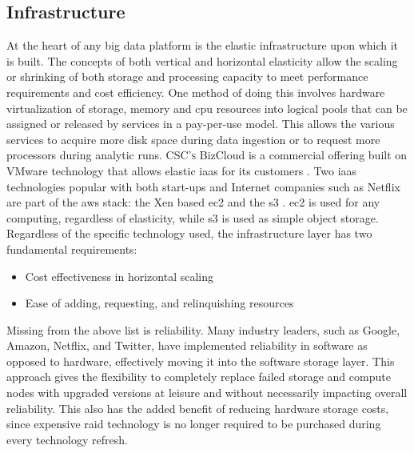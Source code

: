 \subsection{Infrastructure}
At the heart of any big data platform is the elastic infrastructure upon which it is built. The concepts of both vertical and horizontal elasticity allow the scaling or shrinking of both storage and processing capacity to meet performance requirements and cost efficiency. One method of doing this involves hardware virtualization  of storage, memory and \gls{cpu} resources into logical pools that can be assigned or released by services in a pay-per-use model. This allows the various services to acquire more disk space during data ingestion or to request more processors during analytic runs. \textsc{CSC's} BizCloud is a commercial offering built on VMware  technology that allows elastic \gls{iaas} for its customers \cite{bizcloud}. Two \gls{iaas} technologies popular with both start-ups and Internet companies such as Netflix are part of the \gls{aws} stack: the Xen based \gls{ec2} and the \gls{s3} \cite{cockcroft}. \gls{ec2} is used for any computing, regardless of elasticity, while \gls{s3} is used as simple object storage. Regardless of the specific technology used, the infrastructure layer has two fundamental requirements:
\begin{itemize}
    \item Cost effectiveness in horizontal scaling
    \item Ease of adding, requesting, and relinquishing resources
\end{itemize}
Missing from the above list is reliability. Many industry leaders, such as Google, Amazon, Netflix, and Twitter, have implemented reliability in software as opposed to hardware, effectively moving it into the software storage layer. This approach gives the flexibility to completely replace failed storage and compute nodes with upgraded versions at leisure and without necessarily impacting overall reliability. This also has the added benefit of  reducing hardware storage costs, since expensive \gls{raid} technology is no longer required to be purchased during every technology refresh.\\


